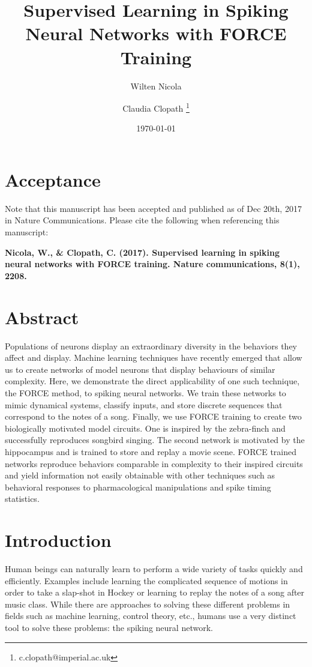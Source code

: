 \documentclass[11pt]{article} %
\title{Supervised Learning in Spiking Neural Networks with FORCE Training}
\date{\today} %
\author[1]{Wilten Nicola}
\author[1]{Claudia Clopath \thanks{c.clopath@imperial.ac.uk}}
\affil[1]{Department of Bioengineering, Imperial College London.  Royal School of Mines\\ London  UK\\  SW7 2AZ}
\begin{document}
\maketitle    


\section*{Acceptance} Note that this manuscript has been accepted and published as of Dec 20th, 
2017 in Nature Communications.  Please cite the following when referencing this manuscript: 


\textbf{
Nicola, W., \& Clopath, C. (2017). Supervised learning in spiking neural networks with FORCE training. Nature communications, 8(1), 2208.}


\section*{Abstract}

Populations of neurons display an extraordinary diversity in the behaviors they affect and display. 
Machine learning techniques have recently emerged that allow us to create networks of model neurons 
that display behaviours of similar complexity. Here, we demonstrate the direct applicability of one 
such technique, the FORCE method, to spiking neural networks.  We train these networks to mimic 
dynamical systems, classify inputs, and store discrete sequences that correspond to the notes of a song. 
Finally, we use FORCE training to create two biologically motivated model circuits. One is inspired by the  
zebra-finch and successfully reproduces songbird singing. The second network is motivated by the hippocampus 
and is trained to store and replay a movie scene.   
FORCE trained networks reproduce behaviors comparable in complexity to their inspired circuits and 
yield information not easily obtainable with other techniques such as behavioral responses to 
pharmacological manipulations and spike timing statistics.  

\section*{Introduction}  

Human beings can naturally learn to perform a wide variety of tasks  quickly and efficiently.  
Examples include learning the complicated sequence of motions in order to take a slap-shot in Hockey or 
learning to replay the notes of a song after music class.   
While there are approaches to solving these different problems in fields such as machine learning, 
control theory, etc., humans use a very distinct tool to solve these problems: the spiking neural network.  
\end{document}
